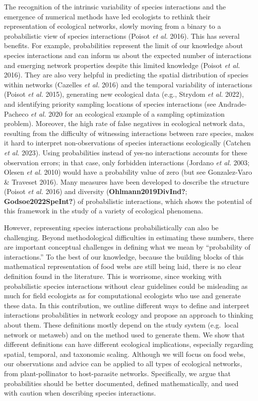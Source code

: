\documentclass[10pt,oneside]{article}
\begin{document}
The recognition of the intrinsic variability of species interactions and
the emergence of numerical methods have led ecologists to rethink their
representation of ecological networks, slowly moving from a binary to a
probabilistic view of species interactions (Poisot \emph{et al.} 2016).
This has several benefits. For example, probabilities represent the
limit of our knowledge about species interactions and can inform us
about the expected number of interactions and emerging network
properties despite this limited knowledge (Poisot \emph{et al.} 2016).
They are also very helpful in predicting the spatial distribution of
species within networks (Cazelles \emph{et al.} 2016) and the temporal
variability of interactions (Poisot \emph{et al.} 2015), generating new
ecological data (e.g., Strydom \emph{et al.} 2022), and identifying
priority sampling locations of species interactions (see Andrade-Pacheco
\emph{et al.} 2020 for an ecological example of a sampling optimization
problem). Moreover, the high rate of false negatives in ecological
network data, resulting from the difficulty of witnessing interactions
between rare species, makes it hard to interpret non-observations of
species interactions ecologically (Catchen \emph{et al.} 2023). Using
probabilities instead of yes-no interactions accounts for these
observation errors; in that case, only forbidden interactions (Jordano
\emph{et al.} 2003; Olesen \emph{et al.} 2010) would have a probability
value of zero (but see Gonzalez-Varo \& Traveset 2016). Many measures
have been developed to describe the structure (Poisot \emph{et al.}
2016) and diversity (\textbf{Ohlmann2019DivInd?};
\textbf{Godsoe2022SpeInt?}) of probabilistic interactions, which shows
the potential of this framework in the study of a variety of ecological
phenomena.

However, representing species interactions probabilistically can also be
challenging. Beyond methodological difficulties in estimating these
numbers, there are important conceptual challenges in defining what we
mean by ``probability of interactions.'' To the best of our knowledge,
because the building blocks of this mathematical representation of food
webs are still being laid, there is no clear definition found in the
literature. This is worrisome, since working with probabilistic species
interactions without clear guidelines could be misleading as much for
field ecologists as for computational ecologists who use and generate
these data. In this contribution, we outline different ways to define
and interpret interactions probabilities in network ecology and propose
an approach to thinking about them. These definitions mostly depend on
the study system (e.g.~local network or metaweb) and on the method used
to generate them. We show that different definitions can have different
ecological implications, especially regarding spatial, temporal, and
taxonomic scaling. Although we will focus on food webs, our observations
and advice can be applied to all types of ecological networks, from
plant-pollinator to host-parasite networks. Specifically, we argue that
probabilities should be better documented, defined mathematically, and
used with caution when describing species interactions.
\end{document}
